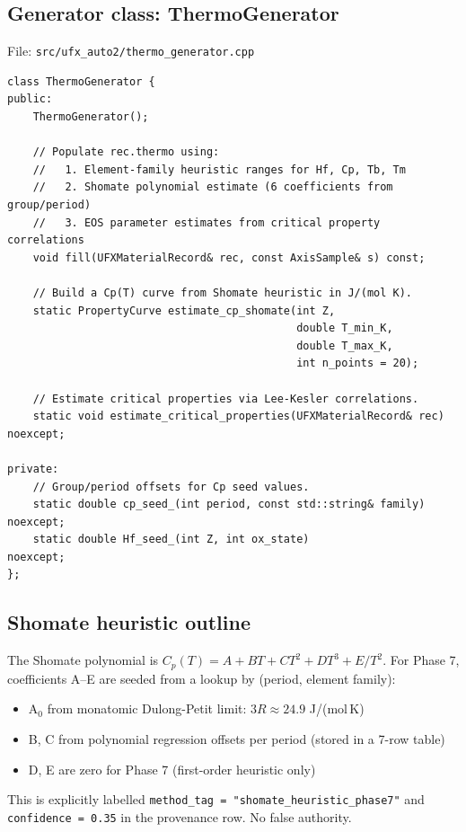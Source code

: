 \documentclass[11pt, a4paper]{article}
\begin{document}
\subsection{Generator class: ThermoGenerator}

File: \texttt{src/ufx\_auto2/thermo\_generator.cpp}

\begin{lstlisting}
class ThermoGenerator {
public:
	ThermoGenerator();

	// Populate rec.thermo using:
	//   1. Element-family heuristic ranges for Hf, Cp, Tb, Tm
	//   2. Shomate polynomial estimate (6 coefficients from group/period)
	//   3. EOS parameter estimates from critical property correlations
	void fill(UFXMaterialRecord& rec, const AxisSample& s) const;

	// Build a Cp(T) curve from Shomate heuristic in J/(mol K).
	static PropertyCurve estimate_cp_shomate(int Z,
											 double T_min_K,
											 double T_max_K,
											 int n_points = 20);

	// Estimate critical properties via Lee-Kesler correlations.
	static void estimate_critical_properties(UFXMaterialRecord& rec) noexcept;

private:
	// Group/period offsets for Cp seed values.
	static double cp_seed_(int period, const std::string& family) noexcept;
	static double Hf_seed_(int Z, int ox_state)                   noexcept;
};
\end{lstlisting}

\subsection{Shomate heuristic outline}

The Shomate polynomial is $C_p(T) = A + BT + CT^2 + DT^3 + E/T^2$.
For Phase 7, coefficients A--E are seeded from a lookup by (period, element family):

\begin{itemize}[leftmargin=*, itemsep=2pt]
  \item A$_0$ from monatomic Dulong-Petit limit: $3R \approx 24.9$ J/(mol\,K)
  \item B, C from polynomial regression offsets per period (stored in a 7-row table)
  \item D, E are zero for Phase 7 (first-order heuristic only)
\end{itemize}

This is explicitly labelled \texttt{method\_tag = "shomate\_heuristic\_phase7"} and
\texttt{confidence = 0.35} in the provenance row.  No false authority.
\end{document}
